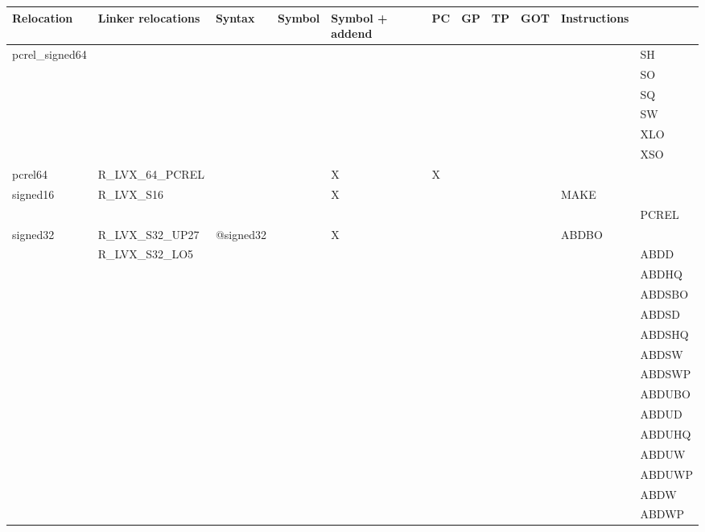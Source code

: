 {\tiny
\begin{tabular}{|l|l|l|l|l|l|l|l|l|l|l|} \hline
\textsf{Relocation} & \textsf{Linker relocations} & \textsf{Syntax} & \textsf{Symbol} & \textsf{Symbol + addend} & \textsf{PC} & \textsf{GP} & \textsf{TP} & \textsf{GOT} & \textsf{Instructions} \\
\hline
\textsf{pcrel\_signed64} & & & & & & & & & & \textsf{SH} \\
 & & & & & & & & & & \textsf{SO} \\
 & & & & & & & & & & \textsf{SQ} \\
 & & & & & & & & & & \textsf{SW} \\
 & & & & & & & & & & \textsf{XLO} \\
 & & & & & & & & & & \textsf{XSO} \\
\hline
\textsf{pcrel64} & \textsf{R\_LVX\_64\_PCREL} & \textsf{} & \textsf{} & \textsf{X} & \textsf{X} & \textsf{} & \textsf{} & \textsf{} & \textsf{} \\
\hline
\textsf{signed16} & \textsf{R\_LVX\_S16} & \textsf{} & \textsf{} & \textsf{X} & \textsf{} & \textsf{} & \textsf{} & \textsf{} & \textsf{MAKE} \\
 & & & & & & & & & & \textsf{PCREL} \\
\hline
\textsf{signed32} & \textsf{R\_LVX\_S32\_UP27} & \textsf{@signed32} & \textsf{} & \textsf{X} & \textsf{} & \textsf{} & \textsf{} & \textsf{} & \textsf{ABDBO} \\
 & \textsf{R\_LVX\_S32\_LO5} & & & & & & & & & \textsf{ABDD} \\
 & & & & & & & & & & \textsf{ABDHQ} \\
 & & & & & & & & & & \textsf{ABDSBO} \\
 & & & & & & & & & & \textsf{ABDSD} \\
 & & & & & & & & & & \textsf{ABDSHQ} \\
 & & & & & & & & & & \textsf{ABDSW} \\
 & & & & & & & & & & \textsf{ABDSWP} \\
 & & & & & & & & & & \textsf{ABDUBO} \\
 & & & & & & & & & & \textsf{ABDUD} \\
 & & & & & & & & & & \textsf{ABDUHQ} \\
 & & & & & & & & & & \textsf{ABDUW} \\
 & & & & & & & & & & \textsf{ABDUWP} \\
 & & & & & & & & & & \textsf{ABDW} \\
 & & & & & & & & & & \textsf{ABDWP} \\

\end{tabular}}
